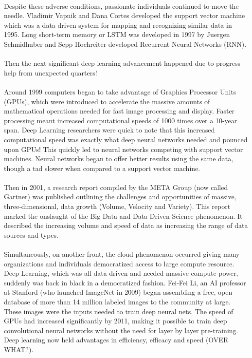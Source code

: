\documentclass[12pt,a4paper]{article}
\begin{document}
\paragraph{}
Despite these adverse conditions, passionate individuals continued to move the needle. Vladimir Vapnik and Dana Cortes developed the support vector machine which was a data driven system for mapping and recognizing similar data in 1995. Long short-term memory or LSTM was developed in 1997 by Juergen Schmidhuber and Sepp Hochreiter developed Recurrent Neural Networks (RNN).
\paragraph{}
Then the next significant deep learning advancement happened due to progress help from unexpected quarters! 
\paragraph{}
Around 1999 computers began to take advantage of Graphics Processor Units (GPUs), which were introduced to accelerate the massive amounts of mathematical operations needed for fast image processing and display. Faster processing meant increased computational speeds of 1000 times over a 10-year span. Deep Learning researchers were quick to note that this increased computational speed was exactly what deep neural networks needed and pounced upon GPUs! This quickly led to neural networks competing with support vector machines. Neural networks began to offer better results using the same data, though a tad slower when compared to a support vector machine.
\paragraph{}
Then in 2001, a research report compiled by the META Group (now called Gartner) was published outlining the challenges and opportunities of massive, three-dimensional, data growth (Volume, Velocity and Variety). This report marked the onslaught of the Big Data and Data Driven Science phenomenon. It described the increasing volume and speed of data as increasing the range of data sources and types. 
\paragraph{}
Simultaneously, on another front, the cloud phenomenon occurred giving many organizations and individuals democratized access to large compute resource. Deep Learning, which was all data driven and needed massive compute power, suddenly was back in black in a democratized fashion. Fei-Fei Li, an AI professor at Stanford (who launched ImageNet in 2009) began assembling a free, open database of more than 14 million labeled images to the community at large. These images were the inputs needed to train deep neural nets. The speed of GPUs had increased significantly by 2011, making it possible to train deep convolutional neural networks without the need for layer by layer pre-training. Deep learning now held advantages in efficiency, efficacy and speed (OVER WHAT?).
\end{document}
